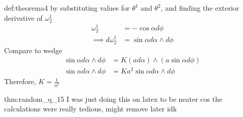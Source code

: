 \documentclass[landscape, 8pt]{extarticle}
\begin{document}
\begin{multicols}{3}
\begin{xmp}{def:theorema}{4}
    by substituting values for \(\theta^{1}\) and \(\theta^{2}\), and finding the exterior derivative of \(\omega^{1}_{2}\)
    \begin{align*}
        \omega^{1}_{2} &= -\cos\alpha d\phi \\
        \implies d\omega^{1}_{2} &= \sin\alpha d\alpha\wedge d\phi
    \end{align*}
    Compare to wedge
    \begin{align*}
        \sin\alpha d\alpha\wedge d\phi &= K (ad\alpha) \wedge (a\sin\alpha d\phi) \\
        \sin\alpha d\alpha\wedge d\phi&= K a^{2}\sin\alpha d\alpha\wedge d\phi
    \end{align*}
    Therefore, \(\displaystyle K = \frac{1}{a^{2}}\)
\end{xmp}

\begin{xmp}[random q]{thm:random_q_1}{5}
    I was just doing this on latex to be neater cos the calculations were really tedious, might remove later idk


\end{xmp}
\end{multicols}
\end{document}
